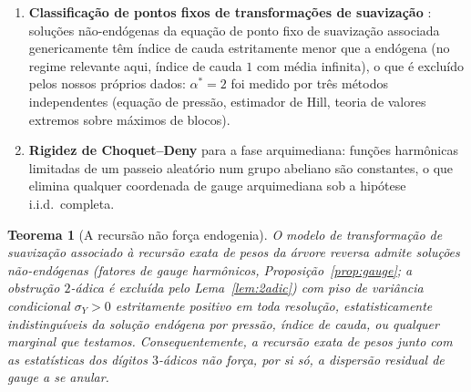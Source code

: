 \documentclass[11pt]{article}
\newtheorem{theorem}{Teorema}[section]
\theoremstyle{definition}
\theoremstyle{remark}
\begin{document}
\begin{enumerate}[label=(\alph*)]
\item \textbf{Classificação de pontos fixos de transformações de
  suavização} \cite{DurrettLiggett1983,AlsmeyerBigginsMeiners2012}:
  soluções não-endógenas da equação de ponto fixo de suavização
  associada genericamente têm índice de cauda estritamente menor que a
  endógena (no regime relevante aqui, índice de cauda $1$ com média
  infinita), o que é excluído pelos nossos próprios dados: $\alpha^\ast=2$
  foi medido por três métodos independentes (equação de pressão,
  estimador de Hill, teoria de valores extremos sobre máximos de
  blocos).
\item \textbf{Rigidez de Choquet--Deny} para a fase arquimediana:
  funções harmônicas limitadas de um passeio aleatório num grupo
  abeliano são constantes, o que elimina qualquer coordenada de gauge
  arquimediana sob a hipótese i.i.d.\ completa.
\end{enumerate}

\begin{theorem}[A recursão não força endogenia]\label{thm:barrier}
O modelo de transformação de suavização associado à recursão exata de
pesos da árvore reversa admite soluções não-endógenas (fatores de
gauge harmônicos, Proposição~\ref{prop:gauge}; a obstrução $2$-ádica é
excluída pelo Lema~\ref{lem:2adic}) com piso de variância condicional
$\sigma_Y>0$ estritamente positivo em toda resolução, estatisticamente
indistinguíveis da solução endógena por pressão, índice de cauda, ou
qualquer marginal que testamos. Consequentemente, a recursão exata de
pesos junto com as estatísticas dos dígitos $3$-ádicos não força, por
si só, a dispersão residual de gauge a se anular.
\end{theorem}
\end{document}
